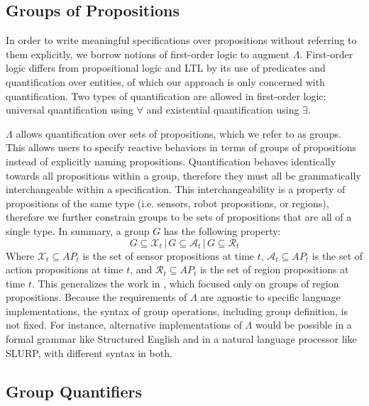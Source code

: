 \subsection{Groups of Propositions} 

In order to write meaningful specifications over propositions without referring to them explicitly, we borrow notions of first-order logic to augment $\Lambda$. 
First-order logic differs from propositional logic and LTL by its use of predicates and quantification over entities, of which our approach is only concerned with quantification. 
Two types of quantification are allowed in first-order logic: universal quantification using $\forall$ and existential quantification using $\exists$. 
\par $\Lambda$ allows quantification over sets of propositions, which we refer to as groups. 
This allows users to specify reactive behaviors in terms of groups of propositions instead of explicitly naming propositions. 
Quantification behaves identically towards all propositions within a group, therefore they must all be grammatically interchangeable within a specification. 
This interchangeability is a property of propositions of the same type (i.e. sensors, robot propositions, or regions), therefore we further constrain groups to be sets of propositions that are all of a single type. 
In summary, a group $G$ has the following property:
\begin{equation}
	G \subseteq \mathcal{X}_t\,|\,G \subseteq \mathcal{A}_t\,|\,G \subseteq \mathcal{R}_t
\end{equation}
Where $\mathcal{X}_t \subseteq AP_t$ is the set of sensor propositions at time $t$, $\mathcal{A}_t \subseteq AP_t$ is the set of action propositions at time $t$, and $\mathcal{R}_t \subseteq AP_t$ is the set of region propositions at time $t$. 
This generalizes the work in \cite{BingxinRSS2012}, which focused only on groups of region propositions. 
Because the requirements of $\Lambda$ are agnostic to specific language implementations, the syntax of group operations, including group definition, is not fixed. 
For instance, alternative implementations of $\Lambda$ would be possible in a formal grammar like Structured English\cite{Finucane2010} and in a natural language processor like SLURP\cite{RamanRSS2013}, with different syntax in both. 

\subsection{Group Quantifiers}

